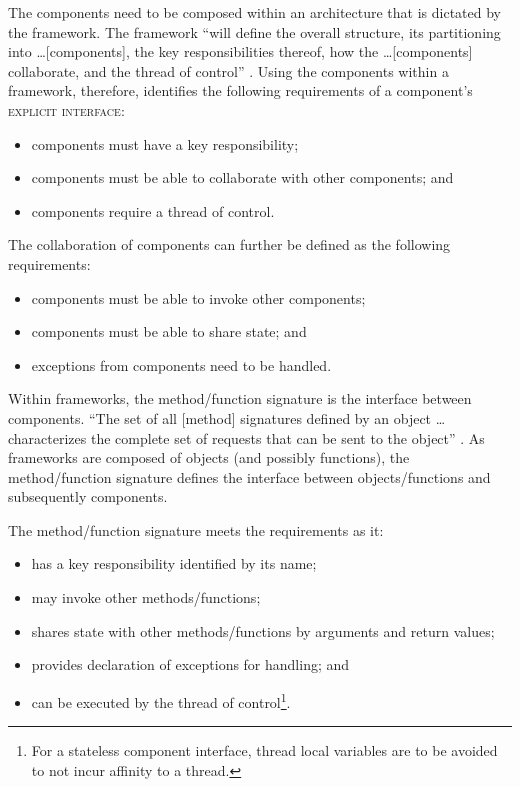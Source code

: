 \documentclass[prodmode]{style/acmlarge}
\begin{document}
The components need to be composed within an architecture that is dictated by
the framework.  The framework ``will define the overall structure, its
partitioning into \ldots [components], the key responsibilities thereof, how the
\ldots [components] collaborate, and the thread of control'' \cite[p.26]{gof}.
Using the components within a framework, therefore, identifies the following
requirements of a component's \textsc{explicit interface}:
\begin{itemize}
  \item components must have a key responsibility;
  \item components must be able to collaborate with other components; and
  \item components require a thread of control.
\end{itemize}

The collaboration of components can further be defined as the following
requirements:
\begin{itemize}
  \item components must be able to invoke other components;
  \item components must be able to share state; and
  \item exceptions from components need to be handled.
\end{itemize}

Within frameworks, the method/function signature is the interface between
components.  ``The set of all [method] signatures defined by an object \ldots
characterizes the complete set of requests that can be sent to the object''
\cite[p. 13]{gof}.  As frameworks are composed of objects (and possibly
functions), the method/function signature defines the interface between
objects/functions and subsequently components.

The method/function signature meets the requirements as it:
\begin{itemize}
  \item has a key responsibility identified by its name;
  \item may invoke other methods/functions;
  \item shares state with other methods/functions by arguments and return values;
  \item provides declaration of exceptions for handling; and
  \item can be executed by the thread of control\footnote{For a stateless component interface, thread local variables are to be avoided to not incur affinity to a thread.}.
\end{itemize}
\end{document}
